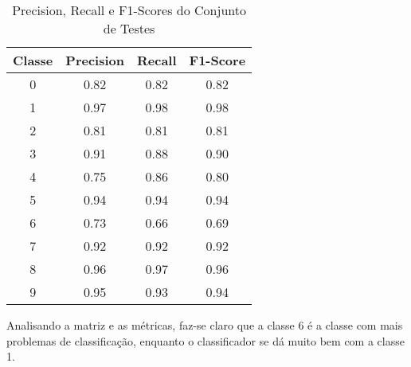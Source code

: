 \documentclass[conference]{IEEEtran}
\begin{document}
\begin{table}[h!]
 \begin{center}
  \caption{Precision, Recall e F1-Scores do Conjunto de Testes}
  \label{table:table3}
  \begin{tabular}{ |c|c|c|c| }
   \hline
   Classe & Precision & Recall & F1-Score\\
   \hline
   0 & 0.82 & 0.82 & 0.82 \\
   1 & 0.97 & 0.98 & 0.98 \\
   2 & 0.81 & 0.81 & 0.81 \\
   3 & 0.91 & 0.88 & 0.90 \\
   4 & 0.75 & 0.86 & 0.80 \\
   5 & 0.94 & 0.94 & 0.94 \\
   6 & 0.73 & 0.66 & 0.69 \\
   7 & 0.92 & 0.92 & 0.92 \\
   8 & 0.96 & 0.97 & 0.96 \\
   9 & 0.95 & 0.93 & 0.94 \\
   \hline
 \end{tabular}
 \end{center}
\end{table}
	
	Analisando a matriz e as métricas, faz-se claro que a classe 6 é a classe com mais problemas de classificação, enquanto o classificador se dá muito bem com a classe 1.

\printbibliography
\end{document}
